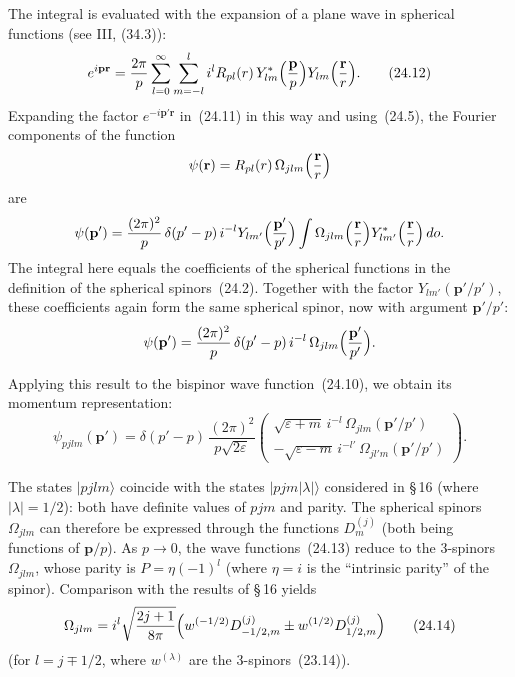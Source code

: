 The integral is evaluated with the expansion of a plane wave in spherical functions (see III, (34.3)):
\begin{equation}
e^{i\mathbf{p}\mathbf{r}} = \frac{2\pi}{p}\sum_{l=0}^{\infty}\sum_{m=-l}^{l}i^l R_{pl}(r)\,Y^*_{lm}\Bigl(\frac{\mathbf{p}}{p}\Bigr)Y_{lm}\Bigl(\frac{\mathbf{r}}{r}\Bigr).
\tag{24.12}
\end{equation}
Expanding the factor $e^{-i\mathbf{p}'\mathbf{r}}$ in~(24.11) in this way and using~(24.5), the Fourier components of the function
\[
\psi(\mathbf{r}) = R_{pl}(r)\,\Omega_{jlm}\Bigl(\frac{\mathbf{r}}{r}\Bigr)
\]
are
\[
\psi(\mathbf{p}') = \frac{(2\pi)^2}{p}\,\delta(p' - p)\,i^{-l}Y_{lm'}\Bigl(\frac{\mathbf{p}'}{p'}\Bigr)\int \Omega_{jlm}\Bigl(\frac{\mathbf{r}}{r}\Bigr)Y^*_{lm'}\Bigl(\frac{\mathbf{r}}{r}\Bigr)\,do.
\]
The integral here equals the coefficients of the spherical functions in the definition of the spherical spinors~(24.2). Together with the factor $Y_{lm'}(\mathbf{p}'/p')$, these coefficients again form the same spherical spinor, now with argument $\mathbf{p}'/p'$:
\[
\psi(\mathbf{p}') = \frac{(2\pi)^2}{p}\,\delta(p' - p)\,i^{-l}\,\Omega_{jlm}\Bigl(\frac{\mathbf{p}'}{p'}\Bigr).
\]

Applying this result to the bispinor wave function~(24.10), we obtain its momentum representation:
\begin{equation}
\psi_{pjlm}(\mathbf{p}') = \delta(p' - p)\,\frac{(2\pi)^2}{p\sqrt{2\varepsilon}}\begin{pmatrix} \sqrt{\varepsilon + m}\,i^{-l}\,\Omega_{jlm}(\mathbf{p}'/p')\\ -\sqrt{\varepsilon - m}\,i^{-l'}\,\Omega_{jl'm}(\mathbf{p}'/p') \end{pmatrix}.
\tag{24.13}
\end{equation}

The states $|pjlm\rangle$ coincide with the states $|pjm|\lambda|\rangle$ considered in \S\,16 (where $|\lambda| = 1/2$): both have definite values of $pjm$ and parity. The spherical spinors $\Omega_{jlm}$ can therefore be expressed through the functions $D^{(j)}_m$ (both being functions of $\mathbf{p}/p$). As $p \to 0$, the wave functions~(24.13) reduce to the 3-spinors $\Omega_{jlm}$, whose parity is $P = \eta(-1)^l$ (where $\eta = i$ is the ``intrinsic parity'' of the spinor). Comparison with the results of \S\,16 yields
\begin{equation}
\Omega_{jlm} = i^l\sqrt{\frac{2j+1}{8\pi}}\Bigl(w^{(-1/2)}D^{(j)}_{-1/2,m} \pm w^{(1/2)}D^{(j)}_{1/2,m}\Bigr)
\tag{24.14}
\end{equation}
(for $l = j \mp 1/2$, where $w^{(\lambda)}$ are the 3-spinors~(23.14)).

